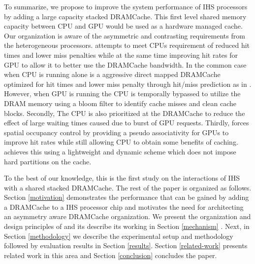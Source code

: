To summarize, we propose to improve the system performance of IHS processors by adding a large capacity stacked DRAMCache. This first level shared memory capacity between CPU and GPU would be used as a hardware managed cache. Our organization \textit{\cachename} is aware of the asymmetric and contrasting requirements from the heterogeneous processors. \textit{\cachename} attempts to meet CPUs requirement of reduced hit times and lower miss penalties while at the same time improving hit rates for GPU to allow it to better use the DRAMCache bandwidth. In the common case when CPU is running alone \textit{\cachename} is a aggressive direct mapped DRAMCache optimized for hit times and lower miss penalty through hit/miss prediction as in \cite{alloy}. However, when GPU is running the CPU is temporally bypassed to utilize the DRAM memory using a bloom filter to identify cache misses and clean cache blocks. Secondly, The CPU is also prioritized at the DRAMCache to reduce the effect of large waiting times caused due to burst of GPU requests. Thirdly, \cachename forces spatial occupancy control by providing a pseudo associativity for GPUs to improve hit rates while still allowing CPU to obtain some benefits of caching. \cachename achieves this using a lightweight and dynamic scheme which does not impose hard partitions on the cache.

\par To the best of our knowledge, this is the first study on the interactions of IHS with a shared stacked DRAMCache. The rest of the paper is organized as follows. Section \ref{motivation} demonstrates the performance that can be gained by adding a DRAMCache to a IHS processor chip and motivates the need for architecting an asymmetry aware DRAMCache organization. We present the organization and design principles of \cachename and its describe its working in Section \ref{mechanism} . Next, in Section \ref{methodology} we describe the experimental setup and methodology followed by evaluation results in Section \ref{results}. Section \ref{related-work} presents related work in this area and Section \ref{conclusion} concludes the paper.
